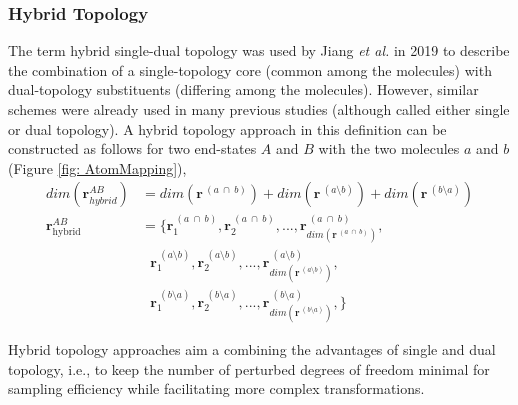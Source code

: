 \subsubsection{Hybrid Topology}
The term hybrid single-dual topology was used by Jiang \textit{et al.}\cite{Jiang2019} in 2019 to describe the combination of a single-topology core (common among the molecules) with dual-topology substituents (differing among the molecules). However, similar schemes were already used in many previous studies (although called either single or dual topology).\cite{Eriksson1995,Shobana2000, Gapsys2015, Petrov2021, Seeliger2010, Riniker2011}
%
A hybrid topology approach in this definition can be constructed as follows for two end-states $A$ and $B$ with the two molecules $a$ and $b$ (Figure \ref{fig: AtomMapping}),
\begin{align*}
    dim(\textbf{r}_{hybrid}^{AB}) &= dim(\textbf{r}^{~(a~\cap~b)}) + dim(\textbf{r}^{~(a \setminus b)}) + dim(\textbf{r}^{~(b \setminus a)})\\
    \textbf{r}^{AB}_{\text{hybrid}} &= \{\textbf{r}^{~(a~\cap~b)}_{1}, \textbf{r}^{~(a~\cap~b)}_{2}, ..., \textbf{r}^{~(a~\cap~b)}_{dim(\textbf{r}^{~(a~\cap~b)})}, \\
    &~~~\textbf{r}^{~(a \setminus b)}_{1}, \textbf{r}^{~(a \setminus b)}_{2}, ..., \textbf{r}^{~(a \setminus b)}_{dim(\textbf{r}^{~(a \setminus b)})}, \\
    &~~~\textbf{r}^{~(b \setminus a)}_{1}, \textbf{r}^{~(b \setminus a)}_{2}, ..., \textbf{r}^{~(b \setminus a)}_{dim(\textbf{r}^{~(b \setminus a)})}, \}
\end{align*}
 
Hybrid topology approaches aim a combining the advantages of single and dual topology, i.e., to keep the number of perturbed degrees of freedom minimal for sampling efficiency while facilitating more complex transformations.

